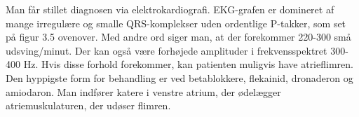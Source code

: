 Man får stillet diagnosen via elektrokardiografi. EKG-grafen er domineret af mange irregulære og smalle QRS-komplekser uden ordentlige P-takker, som set på figur 3.5 ovenover. Med andre ord siger man, at der forekommer 220-300 små udsving/minut. Der kan også være forhøjede amplituder i frekvensspektret 300-400 Hz. Hvis disse forhold forekommer, kan patienten muligvis have atrieflimren.\\ 
Den hyppigste form for behandling er ved betablokkere, flekainid, dronaderon og amiodaron. Man indfører katere i venstre atrium, der ødelægger atriemuskulaturen, der udøser flimren.

  